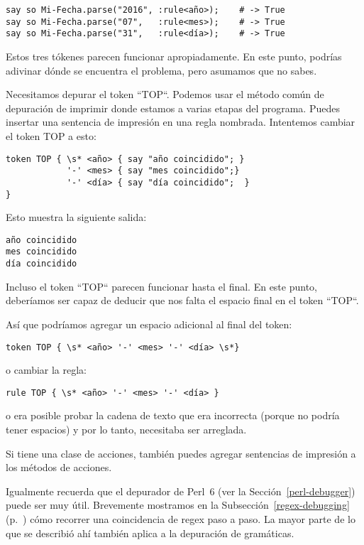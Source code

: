 \begin{verbatim}
say so Mi-Fecha.parse("2016", :rule<año>);    # -> True
say so Mi-Fecha.parse("07",   :rule<mes>);    # -> True
say so Mi-Fecha.parse("31",   :rule<día>);    # -> True
\end{verbatim}

Estos tres tókenes parecen funcionar apropiadamente. En este punto,
podrías adivinar dónde se encuentra el problema, pero 
asumamos que no sabes.

Necesitamos depurar el token ``TOP``. Podemos usar el método común
de depuración de imprimir donde estamos a varias etapas del
programa. Puedes insertar una sentencia de impresión en
una regla nombrada. Intentemos cambiar el token TOP a esto:

\begin{verbatim}
token TOP { \s* <año> { say "año coincidido"; }
            '-' <mes> { say "mes coincidido";}
            '-' <día> { say "día coincidido";  }
}
\end{verbatim}

Esto muestra la siguiente salida:

\begin{verbatim}
año coincidido
mes coincidido
día coincidido
\end{verbatim}


Incluso el token ``TOP`` parecen funcionar hasta el final. 
En este punto, deberíamos ser capaz de deducir que nos falta
el espacio final en el token ``TOP``.

Así que podríamos agregar un espacio adicional al final del
token:

\begin{verbatim}
token TOP { \s* <año> '-' <mes> '-' <día> \s*}
\end{verbatim}

o cambiar la regla:

\begin{verbatim}
rule TOP { \s* <año> '-' <mes> '-' <día> }
\end{verbatim}

o era posible probar la cadena de texto que era incorrecta (porque
no podría tener espacios) y por lo tanto, necesitaba ser arreglada.

Si tiene una clase de acciones, también puedes agregar sentencias de
impresión a los métodos de acciones.

Igualmente recuerda que el depurador de Perl~6 (ver 
la Sección~\ref{perl-debugger}) puede ser muy útil. 
Brevemente mostramos en la Subsección~\ref{regex-debugging} 
(p.~\pageref{regex-debugging}) cómo recorrer una coincidencia
de regex paso a paso. La mayor parte de lo que se describió 
ahí también aplica a la depuración de gramáticas.

